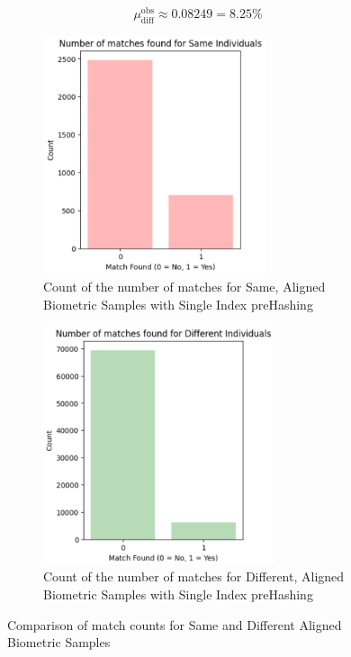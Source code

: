 \begin{enumerate}
\begin{itemize}
        \[ \mu_{\text{diff}}^{\text{obs}} \approx 0.08249 = 8.25\% \]
        \begin{figure}[H]
            \centering
            \begin{subfigure}[b]{0.48\linewidth}
                \centering
                \includegraphics[width=\linewidth,height=7cm,keepaspectratio]{latex-img/mu_same.png}
                \caption{Count of the number of matches for Same, Aligned Biometric Samples with Single Index preHashing}
                \label{mu_same}
            \end{subfigure}
            \hfill
            \begin{subfigure}[b]{0.48\linewidth}
                \centering
                \includegraphics[width=\linewidth,height=7cm,keepaspectratio]{latex-img/mu_diff.png}
                \caption{Count of the number of matches for Different, Aligned Biometric Samples with Single Index preHashing}
                \label{mu_diff}
            \end{subfigure}
            \caption{Comparison of match counts for Same and Different Aligned Biometric Samples}
        \end{figure}
    \end{itemize}
\end{enumerate}

